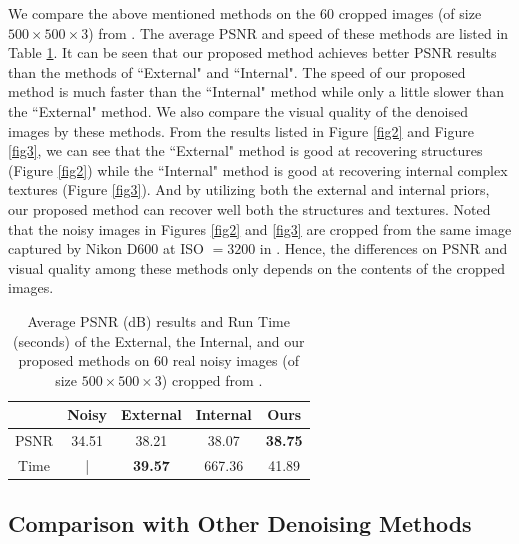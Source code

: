 \documentclass[10pt,twocolumn,letterpaper]{article}
\begin{document}
We compare the above mentioned methods on the 60 cropped images (of size $500\times 500\times3$) from \cite{crosschannel2016}. The average PSNR and speed of these methods are listed in Table \ref{tab1}. It can be seen that our proposed method achieves better PSNR results than the methods of ``External" and ``Internal". The speed of our proposed method is much faster than the ``Internal" method while only a little slower than the ``External" method. We also compare the visual quality of the denoised images by these methods. From the results listed in Figure \ref{fig2} and Figure \ref{fig3}, we can see that the ``External" method is good at recovering structures (Figure \ref{fig2}) while the ``Internal" method is good at recovering internal complex textures (Figure \ref{fig3}). And by utilizing both the external and internal priors, our proposed method can recover well both the structures and textures. Noted that the noisy images in Figures \ref{fig2} and \ref{fig3} are cropped from the same image captured by Nikon D600 at ISO $=3200$ in \cite{crosschannel2016}. Hence, the differences on PSNR and visual quality among these methods only depends on the contents of the cropped images.

\begin{table}
\caption{Average PSNR (dB) results and Run Time (seconds) of the External, the Internal, and our proposed methods on 60 real noisy images (of size $500\times500\times3$) cropped from \cite{crosschannel2016}.}
\label{tab1}
\vspace{-3mm}
\begin{center}
\renewcommand\arraystretch{1}
\begin{tabular}{|c||c|c|c|c|}
\hline
 & \textbf{Noisy} &\textbf{External} &\textbf{Internal} &\textbf{Ours}  
\\
\hline
PSNR & 34.51 & 38.21 & 38.07 & \textbf{38.75} 
\\
\hline
Time & | &  \textbf{39.57}  & 667.36 & 41.89
\\
\hline
\end{tabular}
\end{center}\vspace{-6mm}
\end{table}

\subsection{Comparison with Other Denoising Methods}
\end{document}
